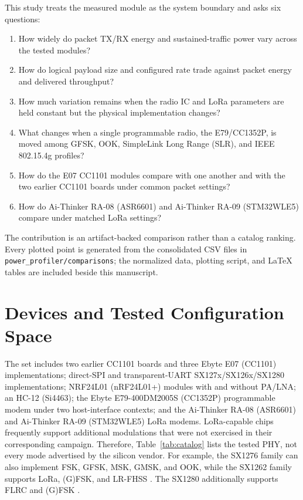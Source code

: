 \documentclass[10pt,a4paper]{article}
\newcommand{\code}[1]{\texttt{#1}}
\newcommand{\dataset}{\code{power\_profiler/comparisons}}
\begin{document}
This study treats the measured module as the system boundary and asks six questions:

\begin{enumerate}
  \item How widely do packet TX/RX energy and sustained-traffic power vary across the tested modules?
  \item How do logical payload size and configured rate trade against packet energy and delivered throughput?
  \item How much variation remains when the radio IC and LoRa parameters are held constant but the physical implementation changes?
  \item What changes when a single programmable radio, the E79/CC1352P, is moved among GFSK, OOK, SimpleLink Long Range (SLR), and IEEE 802.15.4g profiles?
  \item How do the E07 CC1101 modules compare with one another and with the two earlier CC1101 boards under common packet settings?
  \item How do Ai-Thinker RA-08 (ASR6601) and Ai-Thinker RA-09 (STM32WLE5) compare under matched LoRa settings?
\end{enumerate}

The contribution is an artifact-backed comparison rather than a catalog ranking. Every plotted point is generated from the consolidated CSV files in \dataset; the normalized data, plotting script, and LaTeX tables are included beside this manuscript.

\section{Devices and Tested Configuration Space}

The set includes two earlier CC1101 boards and three Ebyte E07 (CC1101) implementations; direct-SPI and transparent-UART SX127x/SX126x/SX1280 implementations; NRF24L01 (nRF24L01+) modules with and without PA/LNA; an HC-12 (Si4463); the Ebyte E79-400DM2005S (CC1352P) programmable modem under two host-interface contexts; and the Ai-Thinker RA-08 (ASR6601) and Ai-Thinker RA-09 (STM32WLE5) LoRa modems. LoRa-capable chips frequently support additional modulations that were not exercised in their corresponding campaign. Therefore, Table~\ref{tab:catalog} lists the tested PHY, not every mode advertised by the silicon vendor. For example, the SX1276 family can also implement FSK, GFSK, MSK, GMSK, and OOK, while the SX1262 family supports LoRa, (G)FSK, and LR-FHSS \cite{semtech_sx1276,semtech_sx1262}. The SX1280 additionally supports FLRC and (G)FSK \cite{semtech_sx1280}.
\end{document}
